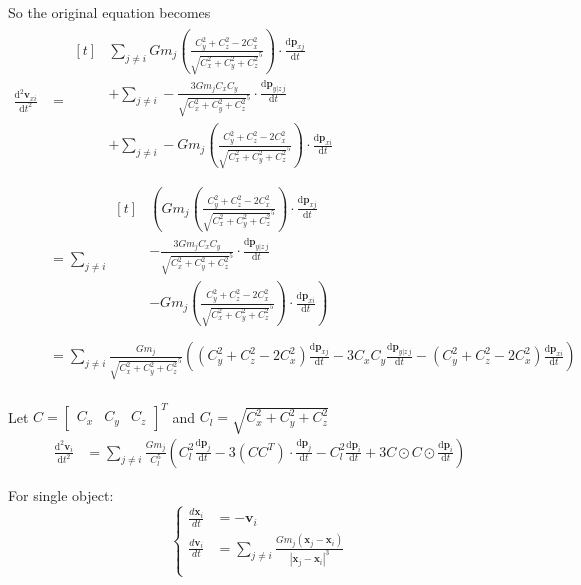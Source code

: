 \documentclass[12pt,letterpaper]{article}
\newcommand{\ve}[1]{\bm{#1}}
\newcommand{\vex}{\bm{x}}
\newcommand{\vep}{\bm{p}}
\newcommand{\vev}{\bm{v}}
\newcommand{\der}[2]{\frac{\text{d} #1}{\text{d} #2}}
\newcommand{\ders}[2]{\frac{\text{d}^2 #1}{{\text{d} #2}^2}}
\begin{document}
    So the original equation becomes
    \begin{align*}
        \ders{\vev_{xi}}{t}
        &=\begin{aligned}[t]
            &\sum_{j\neq i}Gm_j\left(\frac{C_y^2+C_z^2-2C_x^2}{\sqrt{C_x^2+C_y^2+C_z^2}^5}\right) \cdot \der{\vep_{xj}}{t}\\
            &+\sum_{j\neq i}-\frac{3Gm_jC_xC_y}{\sqrt{C_x^2+C_y^2+C_z^2}^5} \cdot \der{\vep_{y|z\,j}}{t}\\
            &+\sum_{j\neq i}-Gm_j\left(\frac{C_y^2+C_z^2-2C_x^2}{\sqrt{C_x^2+C_y^2+C_z^2}^5}\right) \cdot \der{\vep_{xi}}{t}\\
        \end{aligned}\\
        &=\sum_{j\neq i}\begin{aligned}[t]
            &\left(Gm_j\left(\frac{C_y^2+C_z^2-2C_x^2}{\sqrt{C_x^2+C_y^2+C_z^2}^5}\right) \cdot \der{\vep_{xj}}{t}\right.\\
            &-\frac{3Gm_jC_xC_y}{\sqrt{C_x^2+C_y^2+C_z^2}^5} \cdot \der{\vep_{y|z\,j}}{t}\\
            &\left.-Gm_j\left(\frac{C_y^2+C_z^2-2C_x^2}{\sqrt{C_x^2+C_y^2+C_z^2}^5}\right) \cdot \der{\vep_{xi}}{t}\right)\\
        \end{aligned}\\
        &=\sum_{j\neq i}\frac{Gm_j}{\sqrt{C_x^2+C_y^2+C_z^2}^5}\left(\left(C_y^2+C_z^2-2C_x^2\right) \der{\vep_{xj}}{t}-3C_xC_y \der{\vep_{y|z\,j}}{t}-\left(C_y^2+C_z^2-2C_x^2\right) \der{\vep_{xi}}{t}\right)\\
    \end{align*}


    Let $C=\left[\begin{matrix}C_x&C_y&C_z\end{matrix}\right]^T$ and $C_l = \sqrt{C_x^2+C_y^2+C_z^2}$
    \begin{align*}
        \ders{\vev_{i}}{t}
        &=\sum_{j\neq i}\frac{Gm_j}{C_l^5}\left(C_l^2\der{\vep_{j}}{t}-3(CC^T)\cdot\der{\vep_{j}}{t}-C_l^2\der{\vep_{i}}{t}+3C\odot C\odot \der{\vep_{i}}{t}\right)
    \end{align*}




    \clearpage
    For single object:
    \[
    \begin{cases}
        \frac{d\ve{x}_i}{dt}&=-\ve{v}_i \\
        \frac{d\ve{v}_i}{dt}&=\sum_{j\neq i}\frac{Gm_j(\vex_j-\vex_i)}{|\vex_j-\vex_i|^3} \\
    \end{cases}
    \]
\end{document}
